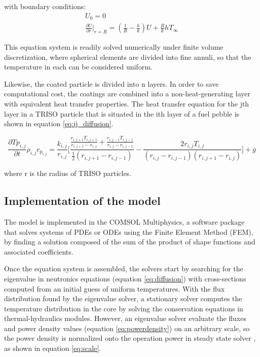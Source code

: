\documentclass{elsarticle}
\begin{document}
with boundary conditions:
\begin{align}
U_0 = 0\\
\frac{\partial U}{\partial r} |_{r=R} = \left( \frac{1}{R} - \frac{h}{k}\right) U + \frac{R}{k}hT_{\infty}
\end{align}

This equation system is readily solved numerically under finite volume discretization, where spherical elements are divided into fine annuli, so that the temperature in each can be considered uniform. 


Likewise, the coated particle is divided into n layers. In order to save computational cost, the coatings are combined into a non-heat-generating layer with equivalent heat transfer properties. The heat transfer equation for the jth layer in a TRISO particle that is situated in the ith layer of a fuel pebble is shown in equation \ref{eq:ij_diffusion}.

\begin{equation}
    \frac{\partial{Tp_{i,j}}}{\partial{t}}\rho_{i,j}c_{p_{i,j}} = \frac{k_{i,j}}{r_{i,j}}   \Bigg[  \frac {\frac{r_{i,j+1}T_{i,j+1}}{r_{i,j+1}-r_{i,j}}+\frac{r_{i,j-1}T_{i, j-1}}{r_{i,j}-r_ {i, j-1}  }}{\frac{1}{2}(r_ {i, j+1} -r_ {i, j-1} )}-\frac{2r_ {i, j} T_ {i,j} }{(r_ {i,j} -r_ {i,j-1} )(r_ {i, j+1} -r_ {i,j})} \Bigg]  + g  
    \label{eq:ij_diffusion}
\end{equation}

where r is the radius of TRISO particles.





\subsection{Implementation of the model}
\label{sec:implementation}

The model is implemented in the COMSOL Multiphysics, a software package that solves systems of PDEs or ODEs using the Finite Element Method (FEM), by finding a solution composed of the sum of the product of shape functions and associated coefficients. 

Once the equation system is assembled, the solvers start by searching for the eigenvalue in neutronics equations (equation \ref{eq:diffusion}) with cross-sections computed from an initial guess of uniform temperatures. 
With the flux distribution found by the eigenvalue solver, a stationary solver computes the temperature distribution in the core by solving the conservation equations in thermal-hydraulics modules. However, an eigenvalue solver evaluate the fluxes and power density values (equation \ref{eq:powerdensity}) on an arbitrary scale, so the power density is normalized onto the operation power in steady state solver , as shown in equation \ref{eq:scale}.  
\end{document}
